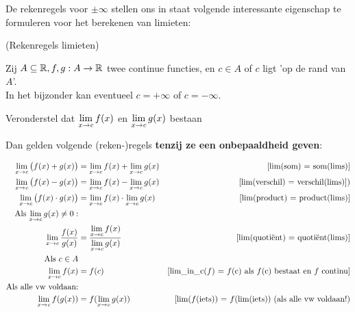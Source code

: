 \documentclass{ximera}
\begin{document}
De rekenregels voor $\pm\infty$ stellen ons in staat volgende interessante eigenschap te formuleren voor het berekenen van limieten:

\begin{proposition} (Rekenregels limieten)
	
	Zij $A\subseteq\mathbb{R}, f,g:A\to\mathbb{R}$ twee continue functies, en $c\in A$ of $c$ ligt 'op de rand van $A$'. \\
	In het bijzonder kan eventueel $c=+\infty$ of $c=-\infty$. 
	
	Veronderstel dat $\limxc f(x)$ en $\limxc g(x)$ bestaan%
	
	Dan gelden volgende (reken-)regels  \textbf{\color{red} tenzij ze een {\large onbepaaldheid} geven}: 
	
	
	\begin{align}
		 \limxc \big(f(x) +g(x)\big) & = \limxc f(x) + \limxc g(x)  
		     & \text{[lim(som) = som(lims)]} \label{elim-som} \\
		 \limxc \big(f(x) -g(x)\big) & = \limxc f(x) - \limxc g(x)  
		     & \text{[lim(verschil) = verschil(lims)])} \label{elim-verschil}\\
		 \limxc \big(f(x)\cdot g(x)\big) & = \limxc f(x) \cdot \limxc g(x)  
		     & \text{[lim(product) =  product(lims)]} \label{elim-product} \\
		 \mbox{Als $\limxc g(x) \neq 0:$} \notag\\
		 \limxc \dfrac{f(x)}{g(x)} & = \dfrac{\limxc f(x)}{\limxc g(x)}  
		     & \text{[lim(quotiënt) = quotiënt(lims)]} \label{elim-quotient} \\
		 \mbox{Als $c\in A$} \notag\\ %
		 \limxc f(x) & = f(c) 
		     & \text{[lim\_in\_c($f$) = $f$(c) als $f$(c) bestaat en $f$ continu]} \label{elim-domein} \\
		 \text{Als alle vw voldaan:} \notag \\ %
		 \limxc f(g(x)) & = f(\limxc g(x)) 
		     & \text{[lim($f$(iets)) =  $f$(lim(iets)) (als alle vw voldaan!)} \label{elim-continu} 
	\end{align}
\end{proposition}
\end{document}
